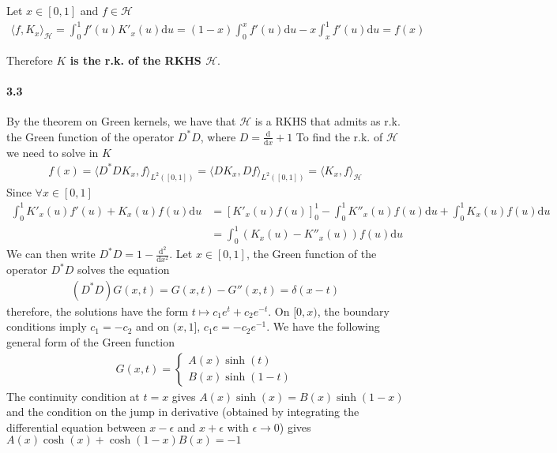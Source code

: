 \documentclass[10pt]{article}
\begin{document}
    Let $x\in[0, 1]$ and $f\in \mathcal{H}$
    \begin{align*}
        \langle f, K_x \rangle_\mathcal{H} = \int_0^1 f'(u)K'_x(u)\text{d}u = 
        (1-x)\int_0^x f'(u)\text{d}u - x \int_x^1 f'(u)\text{d}u = f(x)
    \end{align*}

    Therefore \textbf{$K$ is the r.k. of the RKHS $\mathcal{H}$}.

    \paragraph{3.3} By the theorem on Green kernels, we have that $\mathcal{H}$
    is a RKHS that admits as r.k. the Green function of the operator $D^*D$, 
    where $D = \frac{\text{d}}{\text{d}x} + 1$
    To find the r.k. of $\mathcal{H}$ we need to solve in $K$
    \begin{align*}
        f(x) = \langle D^*DK_x, f\rangle_{L^2([0, 1])} = \langle DK_x, 
        Df\rangle_{L^2([0, 1])} = \langle K_x, f\rangle_{\mathcal{H}}
    \end{align*}
    Since $\forall x \in [0, 1]$
    \begin{align*}
        \int_0^1 K'_x(u)f'(u) + K_x(u)f(u)\text{d}u& = \left[K'_x(u)f(u)
        \right]^1_0 - \int_0^1K''_x(u)f(u)\text{d}u + 
        \int_0^1K_x(u)f(u)\text{d}u\\& = \int_0^1 (K_x(u) - K''_x(u))f(u)
        \text{d}u
    \end{align*}
    We can then write $D^*D = 1 - \frac{\text{d}^2}{\text{d}x^2}$. Let $x
    \in[0, 1]$, the Green function of the operator $D^*D$ solves the equation 
    \begin{align*}
        (D^*D) G(x, t) = G(x, t) - G''(x, t)  = \delta(x-t)
    \end{align*} therefore, the solutions have the form $t\mapsto 
    c_1 e^t + c_2 e^{-t}$. On $[0, x)$, the boundary conditions imply $c_1 = 
    -c_2$ and on $(x, 1]$, $c_1e = -c_2e^{-1}$. We have the following general 
    form of the Green function
    \begin{align*}
        G(x, t) = \begin{cases}
            A(x)\sinh(t)\\
            B(x)\sinh(1 - t)
        \end{cases}
    \end{align*}
    The continuity condition at $t=x$ gives $A(x)\sinh(x) = B(x)\sinh(1-x)$ and 
    the condition on the jump in derivative (obtained by 
    integrating the differential equation between $x-\epsilon$ and
     $x+\epsilon$ with $\epsilon \rightarrow 0$) gives $  A(x) \cosh(x) + 
     \cosh(1-x)B(x) = -1$
\end{document}
